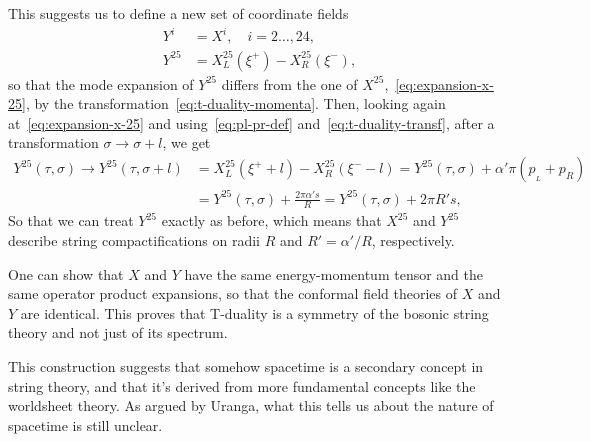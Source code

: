 This suggests us to define a new set of coordinate fields
\begin{equation}
\begin{aligned}
    Y^i &= X^i, \quad i = 2 \dots, 24, \\
    Y^{25} &= X^{25}_L(\xi^+) - X^{25}_R(\xi^-) ,
\end{aligned}
\end{equation}
so that the mode expansion of $Y^{25}$ differs from the one of $X^{25}$,~\eqref{eq:expansion-x-25}, by the transformation~\eqref{eq:t-duality-momenta}. Then, looking again at~\eqref{eq:expansion-x-25} and using~\eqref{eq:pl-pr-def} and~\eqref{eq:t-duality-transf}, after a transformation $\sigma \to \sigma + l$, we get
\begin{equation}
\begin{aligned}
    Y^{25}(\tau, \sigma) \to Y^{25}(\tau, \sigma + l) &= X^{25}_L (\xi^+ + l) - X^{25}_R(\xi^- - l) = Y^{25}(\tau,\sigma) + \alpha' \pi (p_{\!_L} + p_R) \\
    &= Y^{25}(\tau,\sigma) + \frac{2\pi\alpha' s}{R} = Y^{25}(\tau,\sigma) + 2\pi R' s ,
\end{aligned}
\end{equation}
So that we can treat $Y^{25}$ exactly as before, which means that $X^{25}$ and $Y^{25}$ describe string compactifications on radii $R$ and $R' = \alpha'/R$, respectively.

One can show that $X$ and $Y$ have the same energy-momentum tensor and the same operator product expansions, so that the conformal field theories of $X$ and $Y$ are identical. This proves that T-duality is a symmetry of the bosonic string theory and not just of its spectrum.

This construction suggests that somehow spacetime is a secondary concept in string theory, and that it's derived from more fundamental concepts like the worldsheet theory. As argued by Uranga, what this tells us about the nature of spacetime is still unclear.
